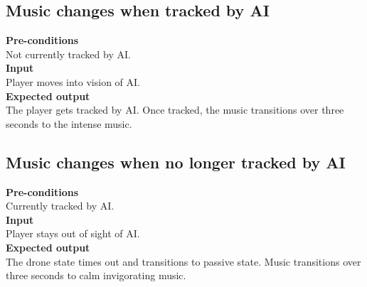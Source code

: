 \documentclass[a4paper,10pt]{article}
\begin{document}
    \subsection{Music changes when tracked by AI}
    \textbf{Pre-conditions}\\
    Not currently tracked by AI.
    \smallskip\\\textbf{Input}\\
    Player moves into vision of AI.
    \smallskip\\\textbf{Expected output}\\
    The player gets tracked by AI. Once tracked, the music transitions over three seconds to the intense music.
    
    \subsection{Music changes when no longer tracked by AI}
    \textbf{Pre-conditions}\\
    Currently tracked by AI.
    \smallskip\\\textbf{Input}\\
    Player stays out of sight of AI.
    \smallskip\\\textbf{Expected output}\\
    The drone state times out and transitions to passive state. Music transitions over three seconds to calm invigorating music.
        
\end{document}
